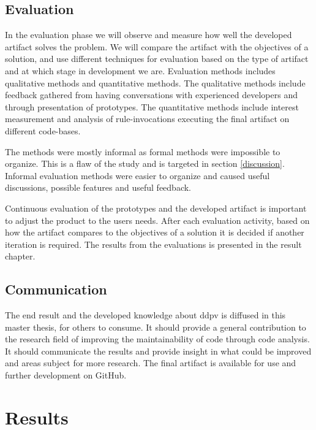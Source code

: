 \documentclass{report}
\begin{document}
\section{Evaluation}
In the evaluation phase we will observe and measure how well the developed artifact solves the problem. We will compare the artifact with the objectives of a solution, and use different techniques for evaluation based on the type of artifact and at which stage in development we are. Evaluation methods includes qualitative methods and quantitative methods. The qualitative methods include feedback gathered from having conversations with experienced developers and through presentation of prototypes. The quantitative methods include interest measurement and analysis of rule-invocations executing the final artifact on different code-bases.  

The methods were mostly informal as formal methods were impossible to organize. This is a flaw of the study and is targeted in section \ref{discussion}. Informal evaluation methods were easier to organize and caused useful discussions, possible features and useful feedback. 

Continuous evaluation of the prototypes and the developed artifact is important to adjust the product to the users needs. After each evaluation activity, based on how the artifact compares to the objectives of a solution it is decided if another iteration is required. The results from the evaluations is presented in the result chapter.

\section{Communication}
The end result and the developed knowledge about \gls{ddpv} is diffused in this master thesis, for others to consume. It should provide a general contribution to the research field of improving the maintainability of code through code analysis. It should communicate the results and provide insight in what could be improved and areas subject for more research. The final artifact is available for use and further development on GitHub\cite{detekt-hint-repository}.

\chapter{Results}
\label{results}
\end{document}
